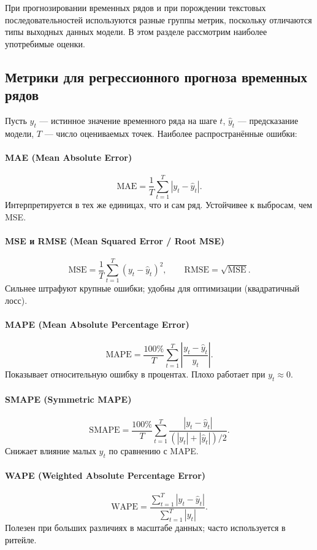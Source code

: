 \documentclass[12pt,a4paper]{article}
\begin{document}
При прогнозировании временных рядов и при порождении текстовых последовательностей используются разные группы метрик, поскольку отличаются типы выходных данных модели. В этом разделе рассмотрим наиболее употребимые оценки.

\subsection{Метрики для регрессионного прогноза временных рядов}

Пусть $y_t$ — истинное значение временного ряда на шаге $t$, $\hat y_t$ — предсказание модели, $T$ — число оцениваемых точек. Наиболее распространённые ошибки:

\paragraph{MAE (Mean Absolute Error)}
\[
\mathrm{MAE} =
\frac{1}{T}\sum_{t=1}^{T} |y_t - \hat y_t|.
\]
Интерпретируется в тех же единицах, что и сам ряд. Устойчивее к выбросам, чем MSE.

\paragraph{MSE и RMSE (Mean Squared Error / Root MSE)}
\[
\mathrm{MSE} = \frac{1}{T}\sum_{t=1}^{T} (y_t - \hat y_t)^2,
\qquad
\mathrm{RMSE} = \sqrt{\mathrm{MSE}}.
\]
Сильнее штрафуют крупные ошибки; удобны для оптимизации (квадратичный лосс).

\paragraph{MAPE (Mean Absolute Percentage Error)}
\[
\mathrm{MAPE} = \frac{100\%}{T}\sum_{t=1}^{T}
\left|\frac{y_t - \hat y_t}{y_t}\right|.
\]
Показывает относительную ошибку в процентах. Плохо работает при $y_t\approx0$.

\paragraph{SMAPE (Symmetric MAPE)}
\[
\mathrm{SMAPE} = \frac{100\%}{T}
\sum_{t=1}^{T}
\frac{|y_t - \hat y_t|}{(|y_t| + |\hat y_t|)/2}.
\]
Снижает влияние малых $y_t$ по сравнению с MAPE.

\paragraph{WAPE (Weighted Absolute Percentage Error)}
\[
\mathrm{WAPE} =
\frac{\sum_{t=1}^{T} |y_t - \hat y_t|}
{\sum_{t=1}^{T} |y_t|}.
\]
Полезен при больших различиях в масштабе данных; часто используется в ритейле.
\end{document}

